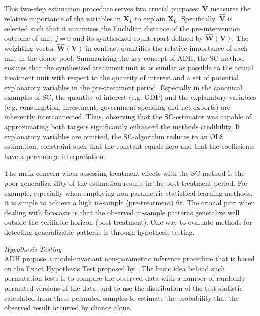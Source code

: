 This two-step estimation procedure serves two crucial purposes: $\widehat{\boldsymbol{V}}$ measures the relative importance of the variables in $\boldsymbol{X_1}$ to explain $\boldsymbol{X_0}$. Specifically, $\widehat{\boldsymbol{V}}$ is selected such that it minimizes the Euclidian distance of the pre-intervention outcome of unit $j = 0$ and its synthesized counterpart defined by $\widehat{\boldsymbol{W}}(\boldsymbol{V})$. The weighting vector $\widehat{\boldsymbol{W}}(\boldsymbol{V})$ in contrast quantifies the relative importance of each unit in the donor pool. Summarizing the key concept of \ac{ADH}, the \ac{SC}-method ensures that the synthesized treatment unit is as similar as possible to the actual treatment unit with respect to the quantity of interest and a set of potential explanatory variables in the pre-treatment period. Especially in the canonical examples of \ac{SC}, the quantity of interest (e.g. \ac{GDP}) and the explanatory variables (e.g. consumption, investment, government spending and net exports) are inherently interconnected. Thus, observing that the \ac{SC}-estimator was capable of approximating both targets significantly enhanced the methods credibility. If explanatory variables are omitted, the \ac{SC}-algorithm reduces to an \ac{OLS} estimation, constraint such that the constant equals zero and that the coefficients have a percentage interpretation.

The main concern when assessing treatment effects with the \ac{SC}-method is the poor 
generalizability of the estimation results in the post-treatment period. For example, especially when employing non-parametric statistical learning methods, it is simple to achieve a high in-sample (pre-treatment) fit. The crucial part when dealing with forecasts is that the observed in-sample patterns generalize well outside the verifiable horizon (post-treatment). One way to evaluate methods for detecting generalizable patterns is through hypothesis testing.

\textit{Hypothesis Testing} \\
\ac{ADH} propose a model-invariant non-parametric inference procedure that is based on the Exact Hypothesis Test proposed by \cite{fisher:1971}. The basic idea behind such permutation tests is to compare the observed data with a number of randomly permuted versions of the data, and to use the distribution of the test statistic calculated from these permuted samples to estimate the probability that the observed result occurred by chance alone. 

